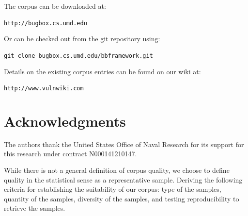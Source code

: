 \documentclass[letterpaper,twocolumn,10pt]{article}
\begin{document}
The corpus can be downloaded at:

\begin{center}
{\tt  http://bugbox.cs.umd.edu}
\end{center}

Or can be checked out from the git repository using:

\begin{center}
{\tt git clone bugbox.cs.umd.edu/bbframework.git}
\end{center}

Details on the existing corpus entries can be found on our wiki at:

\begin{center}
{\tt http://www.vulnwiki.com}
\end{center}

\section*{Acknowledgments}

The authors thank the United States Office of Naval Research for its support for this research under contract N000141210147.


While there is not a general definition of corpus quality, we choose to define quality in the statistical sense as a representative sample.  Deriving the following criteria for establishing the suitability of our corpus: type of the samples, quantity of the samples, diversity of the samples, and testing reproducibility to retrieve the samples.



{\footnotesize 
}
\end{document}
